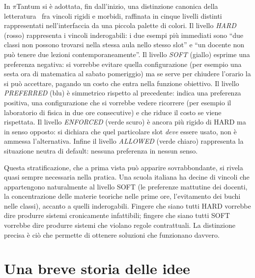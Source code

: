 In $\pi$Tantum si \`e adottata, fin dall'inizio, una
distinzione canonica della letteratura~\parencite{schaerf1999,carter1998}
fra vincoli rigidi e morbidi, raffinata in cinque livelli
distinti rappresentati nell'interfaccia da una piccola
palette di colori. Il livello \emph{HARD} (rosso) rappresenta
i vincoli inderogabili: i due esempi pi\`u immediati sono
``due classi non possono trovarsi nella stessa aula nello
stesso slot'' e ``un docente non pu\`o tenere due lezioni
contemporaneamente''. Il livello \emph{SOFT} (giallo)
esprime una preferenza negativa: si vorrebbe evitare quella
configurazione (per esempio una sesta ora di matematica al
sabato pomeriggio) ma se serve per chiudere l'orario la si
pu\`o accettare, pagando un costo che entra nella funzione
obiettivo. Il livello \emph{PREFERRED} (blu) \`e simmetrico
rispetto al precedente: indica una preferenza positiva, una
configurazione che si vorrebbe vedere ricorrere (per esempio
il laboratorio di fisica in due ore consecutive) e che riduce
il costo se viene rispettata. Il livello \emph{ENFORCED}
(verde scuro) \`e ancora pi\`u rigido di HARD ma in senso
opposto: si dichiara che quel particolare slot \emph{deve}
essere usato, non \`e ammessa l'alternativa. Infine il livello
\emph{ALLOWED} (verde chiaro) rappresenta la situazione
neutra di default: nessuna preferenza in nessun senso.

Questa stratificazione, che a prima vista pu\`o apparire
sovrabbondante, si rivela quasi sempre necessaria nella
pratica. Una scuola italiana ha decine di vincoli che
appartengono naturalmente al livello SOFT (le preferenze
mattutine dei docenti, la concentrazione delle materie
teoriche nelle prime ore, l'evitamento dei buchi nelle
classi), accanto a quelli inderogabili. Fingere che siano
tutti HARD vorrebbe dire produrre sistemi cronicamente
infattibili; fingere che siano tutti SOFT vorrebbe dire
produrre sistemi che violano regole contrattuali. La
distinzione precisa \`e ci\`o che permette di ottenere
soluzioni che funzionano davvero.

\section{Una breve storia delle idee}

